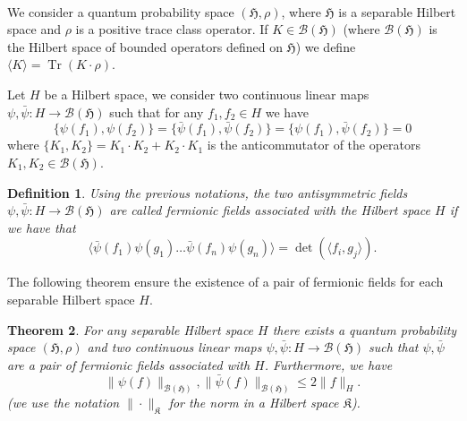 \documentclass[a4paper,10pt]{article}
\newcommand{\tmop}[1]{\ensuremath{\operatorname{#1}}}
\newtheorem{theorem}{Theorem}
\newtheorem{definition}[theorem]{Definition}
\begin{document}
\

We consider a quantum probability space $(\mathfrak{H}, \rho)$, where
$\mathfrak{H}$ is a separable Hilbert space and $\rho$ is a positive trace
class operator. If $K \in \mathcal{B} (\mathfrak{H})$ (where $\mathcal{B}
(\mathfrak{H})$ is the Hilbert space of bounded operators defined on
$\mathfrak{H}$) we define $\langle K \rangle = \tmop{Tr} (K \cdot \rho)$.

Let $H$ be a Hilbert space, we consider two continuous linear maps $\psi,
\bar{\psi} : H \rightarrow \mathcal{B} (\mathfrak{H})$ such that for any $f_1,
f_2 \in H$ we have
\[ \{ \psi (f_1), \psi (f_2) \} = \{ \bar{\psi} (f_1), \bar{\psi} (f_2) \} =
   \{ \psi (f_1), \bar{\psi} (f_2) \} = 0 \]
where $\{ K_1, K_2 \} = K_1 \cdot K_2 + K_2 \cdot K_1$ is the anticommutator
of the operators $K_1, K_2 \in \mathcal{B} (\mathfrak{H})$.

\begin{definition}
  \label{def:psi}Using the previous notations, the two antisymmetric fields
  $\psi, \bar{\psi} : H \rightarrow \mathcal{B} (\mathfrak{H})$ are called
  fermionic fields associated with the Hilbert space $H$ if we have that
  \begin{equation}
    \langle \bar{\psi} (f_1) \psi (g_1) \ldots \bar{\psi} (f_n) \psi (g_n)
    \rangle = \det (\langle f_i, g_j \rangle) . \label{eq:det}
  \end{equation}
\end{definition}

The following theorem ensure the existence of a pair of fermionic fields for
each separable Hilbert space $H$.

\begin{theorem}
  \label{theorem_existence12}For any separable Hilbert space $H$ there exists
  a quantum probability space $(\mathfrak{H}, \rho)$ and two continuous linear
  maps $\psi, \bar{\psi} : H \rightarrow \mathcal{B} (\mathfrak{H})$ such that
  $\psi, \bar{\psi}$ are a pair of fermionic fields associated with $H$.
  Furthermore, we have
  \begin{equation}
    \| \psi (f) \|_{\mathcal{B} (\mathfrak{H})}, \| \bar{\psi} (f)
    \|_{\mathcal{B} (\mathfrak{H})} \leq 2 \| f \|_H . \label{eq:nonfunziona}
  \end{equation}
  (we use the notation $\| \cdot \|_{\mathfrak{K}}$ for the norm in a Hilbert
  space $\mathfrak{K}$).
\end{theorem}
\end{document}
